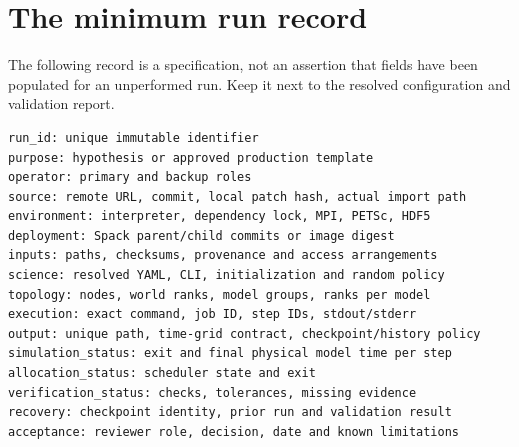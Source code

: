 \documentclass[11pt,a4paper]{article}
\begin{document}
\section{The minimum run record}
The following record is a specification, not an assertion that fields have been populated for an unperformed run. Keep it next to the resolved configuration and validation report.
\begin{minipage}{\linewidth}
\begin{lstlisting}
run_id: unique immutable identifier
purpose: hypothesis or approved production template
operator: primary and backup roles
source: remote URL, commit, local patch hash, actual import path
environment: interpreter, dependency lock, MPI, PETSc, HDF5
deployment: Spack parent/child commits or image digest
inputs: paths, checksums, provenance and access arrangements
science: resolved YAML, CLI, initialization and random policy
topology: nodes, world ranks, model groups, ranks per model
execution: exact command, job ID, step IDs, stdout/stderr
output: unique path, time-grid contract, checkpoint/history policy
simulation_status: exit and final physical model time per step
allocation_status: scheduler state and exit
verification_status: checks, tolerances, missing evidence
recovery: checkpoint identity, prior run and validation result
acceptance: reviewer role, decision, date and known limitations
\end{lstlisting}
\end{minipage}

\clearpage
\end{document}
